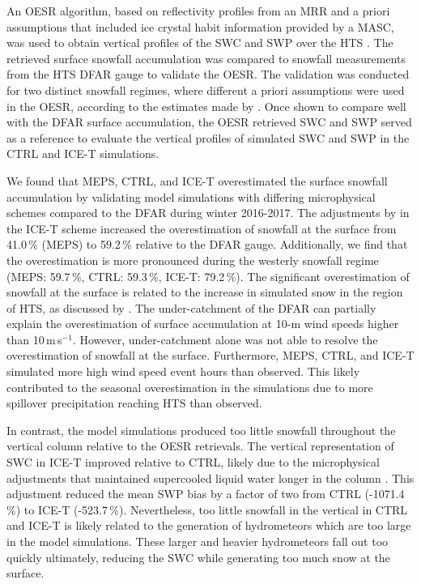 \documentclass{ametsocV5}
\begin{document}
	An OESR algorithm, based on reflectivity profiles from an MRR and a priori assumptions that included ice crystal habit information provided by a MASC, was used to obtain vertical profiles of the SWC and SWP over the HTS \citep{schirle_estimation_2019}. The retrieved surface snowfall accumulation was compared to snowfall measurements from the HTS DFAR gauge to validate the OESR. The validation was conducted for two distinct snowfall regimes, where different a priori assumptions were used in the OESR, according to the estimates made by \citet{schirle_estimation_2019}. Once shown to compare well with the DFAR surface accumulation, the OESR retrieved SWC and SWP served as a reference to evaluate the vertical profiles of simulated SWC and SWP in the CTRL and ICE-T simulations.

	We found that MEPS, CTRL, and ICE-T overestimated the surface snowfall accumulation by validating model simulations with differing microphysical schemes compared to the DFAR during winter 2016-2017. The adjustments by \citet{engdahl_effects_2020} in the ICE-T scheme increased the overestimation of snowfall at the surface from 41.0\,\% (MEPS) to 59.2\,\% relative to the DFAR gauge. Additionally, we find that the overestimation is more pronounced during the westerly snowfall regime (MEPS: 59.7\,\%, CTRL: 59.3\,\%, ICE-T: 79.2\,\%). The significant overestimation of snowfall at the surface is related to the increase in simulated snow in the region of HTS, as discussed by \citet{engdahl_effects_2020}. The under-catchment of the DFAR can partially explain the overestimation of surface accumulation at 10-m wind speeds higher than 10\,m\,s$^{-1}$. However, under-catchment alone was not able to resolve the overestimation of snowfall at the surface. Furthermore, MEPS, CTRL, and ICE-T simulated more high wind speed event hours than observed. This likely contributed to the seasonal overestimation in the simulations due to more spillover precipitation reaching HTS than observed.

	In contrast, the model simulations produced too little snowfall throughout the vertical column relative to the OESR retrievals. The vertical representation of SWC in ICE-T improved relative to CTRL, likely due to the microphysical adjustments that maintained supercooled liquid water longer in the column \citep{engdahl_effects_2020}. This adjustment reduced the mean SWP bias by a factor of two from CTRL (-1071.4\,\%) to ICE-T (-523.7\,\%). 
	Nevertheless, too little snowfall in the vertical in CTRL and ICE-T is likely related to the generation of hydrometeors which are too large in the model simulations. 
	These larger and heavier hydrometeors fall out too quickly ultimately, reducing the SWC while generating too much snow at the surface.	
\end{document}
